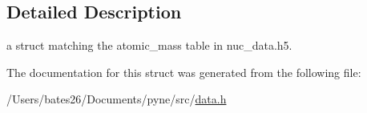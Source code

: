 \subsection{Detailed Description}
a struct matching the atomic\+\_\+mass table in nuc\+\_\+data.\+h5. 

The documentation for this struct was generated from the following file\+:\begin{DoxyCompactItemize}
\item 
/\+Users/bates26/\+Documents/pyne/src/\hyperlink{data_8h}{data.\+h}\end{DoxyCompactItemize}
